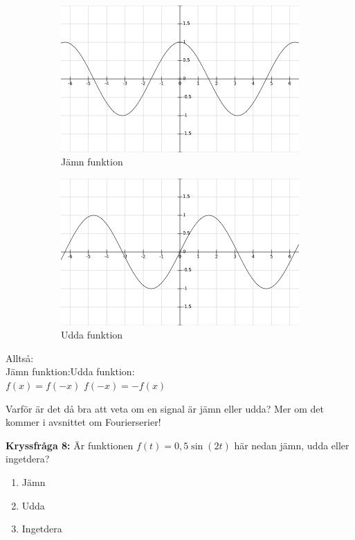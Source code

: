 \documentclass{article}
\begin{document}
\begin{figure}[ht]
\centering
\begin{subfigure}{0.50\textwidth}
  \centering
  \includegraphics[width=0.90\linewidth]{image09.png}
  \caption{Jämn funktion}
  \label{}
\end{subfigure}%
\begin{subfigure}{0.50\textwidth}
  \centering
  \includegraphics[width=0.90\linewidth]{image14.png}
  \caption{Udda funktion}
 \label{}
\end{subfigure}%
\caption{}
\label{}
\end{figure}



Alltså:\\
Jämn funktion:\hfill Udda funktion: \\
$ f(x)=f(-x)$ \hfill $f(-x)=-f(x) $

Varför är det då bra att veta om en signal är jämn eller udda? Mer om det kommer i avsnittet om Fourierserier!

\newpage

\textbf{Kryssfråga 8:} Är funktionen $f(t)=0,5\sin(2t)$ här nedan jämn, udda eller ingetdera?
\begin{enumerate}[label={\alph*)},font={\bfseries}]
    \item Jämn
    \item Udda
    \item Ingetdera
\end{enumerate}
\end{document}
